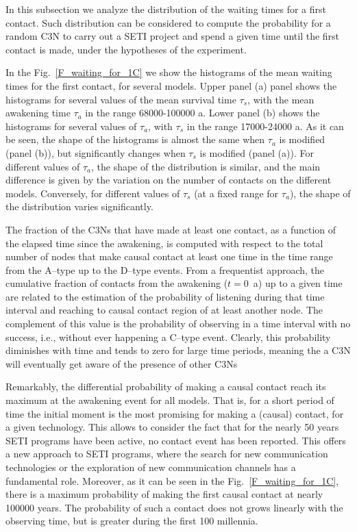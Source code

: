 \documentclass[crop]{CSLB}
\newcommand{\ceti}{C3N}
\newcommand{\cetis}{C3Ns}
\newcommand{\ffn}[1]{}
\begin{document}
In this subsection we analyze the distribution of the waiting times for
a first contact.
%
Such distribution can be considered to compute the probability for a
random \ceti{} to carry out a SETI project and spend a given time until
the first contact is made, under the hypotheses of the experiment.
%
\ffn{6}
%
In the Fig.~\ref{F_waiting_for_1C} we show the histograms of the mean
waiting times for the first contact, for several models.
%
Upper panel (a) panel shows the histograms for several values of the
mean survival time $\tau_s$, with the mean awakening time $\tau_a$ in
the range 68000-100000 a.
%
Lower panel (b) shows the histograms for several values of $\tau_a$,
with $\tau_s$ in the range 17000-24000 a.
%
As it can be seen, the shape of the histograms is almost the same when
$\tau_a$ is modified (panel (b)), but significantly changes when
$\tau_s$ is modified (panel (a)). 
%
For different values of $\tau_a$, the shape of the distribution is
similar, and the main difference is given by the variation on the number of
contacts on the different models.
%
Conversely, for different values of $\tau_s$ (at a fixed range for
$\tau_a$), the shape of the
distribution varies significantly.

 

The fraction of the \cetis{} that have made at least one contact, as a
function of the elapsed time since the awakening, is computed with
respect to the total number of nodes that make causal contact at least
one time in the time range from the A--type up to the D--type
events.
%
From a frequentist approach, the cumulative fraction of contacts
from the awakening
($t=$0~a) up to a given time are related to the estimation of the
probability of listening during that time interval and reaching to
causal contact region of at least another node.
%
The complement of this value is the probability of observing in a time
interval with no success, i.e., without ever happening a C--type
event.
%
Clearly, this probability diminishes with time and tends to zero for
large time periods, meaning the a \ceti{} will eventually get aware of
the presence of other \cetis{}


Remarkably, the differential probability of making a causal contact reach its
maximum at the awakening event for all models.
%
That is, for a short period of time the initial moment is the most promising
for making a (causal) contact, for a given technology.
%
This allows to consider the fact that for the nearly 50 years SETI
programs have been active, no contact event has been reported.
%
This offers a new approach to SETI programs, where the
search for new communication technologies or the exploration of
new communication channels has a fundamental role.
%
Moreover, as it can be seen in the Fig.~\ref{F_waiting_for_1C}, there
is a maximum probability of making the first causal contact at nearly
100000 years.
%
The probability of such a contact does not grows linearly
with the observing time, but is greater during the first 100
millennia.
\end{document}
